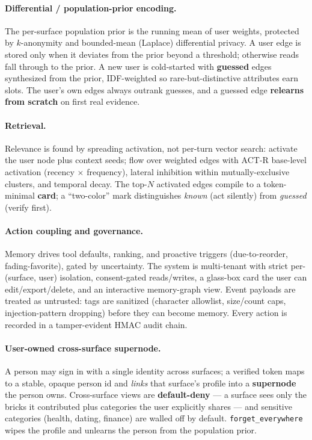 \documentclass[11pt]{article}
\begin{document}
\paragraph{Differential / population-prior encoding.} The per-surface population prior is
the running mean of user weights, protected by $k$-anonymity and bounded-mean (Laplace)
differential privacy. A user edge is stored only when it deviates from the prior beyond a
threshold; otherwise reads fall through to the prior. A new user is cold-started with
\textbf{guessed} edges synthesized from the prior, IDF-weighted so rare-but-distinctive
attributes earn slots. The user's own edges always outrank guesses, and a guessed edge
\textbf{relearns from scratch} on first real evidence.

\paragraph{Retrieval.} Relevance is found by spreading activation, not per-turn vector
search: activate the user node plus context seeds; flow over weighted edges with ACT-R
base-level activation (recency $\times$ frequency), lateral inhibition within
mutually-exclusive clusters, and temporal decay. The top-$N$ activated edges compile to a
token-minimal \textbf{card}; a ``two-color'' mark distinguishes \emph{known} (act
silently) from \emph{guessed} (verify first).

\paragraph{Action coupling and governance.} Memory drives tool defaults, ranking, and
proactive triggers (due-to-reorder, fading-favorite), gated by uncertainty. The system is
multi-tenant with strict per-(surface, user) isolation, consent-gated reads/writes, a
glass-box card the user can edit/export/delete, and an interactive memory-graph view.
Event payloads are treated as untrusted: tags are sanitized (character allowlist,
size/count caps, injection-pattern dropping) before they can become memory. Every action
is recorded in a tamper-evident HMAC audit chain.

\paragraph{User-owned cross-surface supernode.} A person may sign in with a single
identity across surfaces; a verified token maps to a stable, opaque person id and
\emph{links} that surface's profile into a \textbf{supernode} the person owns.
Cross-surface views are \textbf{default-deny} --- a surface sees only the bricks it
contributed plus categories the user explicitly shares --- and sensitive categories
(health, dating, finance) are walled off by default. \texttt{forget\_everywhere} wipes the
profile and unlearns the person from the population prior.
\end{document}
